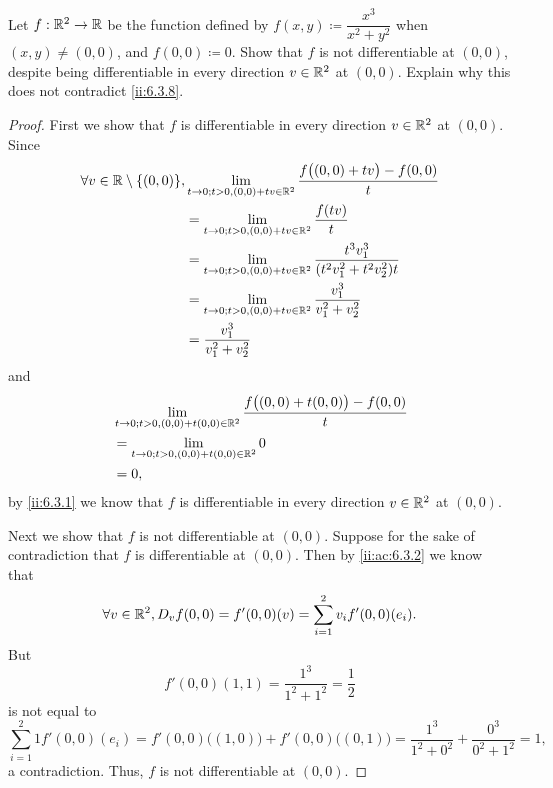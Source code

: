 \begin{ex}\label{ii:ex:6.3.3}
  Let \(f : \mathbb{R}^2 \to \mathbb{R}\) be the function defined by \(f(x, y) \coloneqq \dfrac{x^3}{x^2 + y^2}\) when \((x, y) \neq (0, 0)\), and \(f(0, 0) \coloneqq 0\).
  Show that \(f\) is not differentiable at \((0, 0)\), despite being differentiable in every direction \(v \in \mathbb{R}^2\) at \((0, 0)\).
  Explain why this does not contradict \cref{ii:6.3.8}.
\end{ex}

\begin{proof}
  First we show that \(f\) is differentiable in every direction \(v \in \mathbb{R}^2\) at \((0, 0)\).
  Since
  \begin{align*}
    \forall v \in \R \setminus \set{(0, 0)}, & \lim_{t \to 0 ; t > 0, (0, 0) + tv \in \R^2} \dfrac{f\big((0, 0) + tv\big) - f(0, 0)}{t}    \\
                                             & = \lim_{t \to 0 ; t > 0, (0, 0) + tv \in \R^2} \dfrac{f(tv)}{t}                             \\
                                             & = \lim_{t \to 0 ; t > 0, (0, 0) + tv \in \R^2} \dfrac{t^3 v_1^3}{(t^2 v_1^2 + t^2 v_2^2) t} \\
                                             & = \lim_{t \to 0 ; t > 0, (0, 0) + tv \in \R^2} \dfrac{v_1^3}{v_1^2 + v_2^2}                 \\
                                             & = \dfrac{v_1^3}{v_1^2 + v_2^2}
  \end{align*}
  and
  \begin{align*}
     & \lim_{t \to 0 ; t > 0, (0, 0) + t (0, 0) \in \mathbb{R}^2} \dfrac{f\big((0, 0) + t(0, 0)\big) - f(0, 0)}{t} \\
     & = \lim_{t \to 0 ; t > 0, (0, 0) + t (0, 0) \in \mathbb{R}^2} 0                                              \\
     & = 0,
  \end{align*}
  by \cref{ii:6.3.1} we know that \(f\) is differentiable in every direction \(v \in \mathbb{R}^2\) at \((0, 0)\).

  Next we show that \(f\) is not differentiable at \((0, 0)\).
  Suppose for the sake of contradiction that \(f\) is differentiable at \((0, 0)\).
  Then by \cref{ii:ac:6.3.2} we know that
  \[
    \forall v \in \mathbb{R}^2, D_v f(0, 0) = f'(0, 0)(v) = \sum_{i = 1}^2 v_i f'(0, 0)(e_i).
  \]
  But
  \[
    f'(0, 0)(1, 1) = \dfrac{1^3}{1^2 + 1^2} = \dfrac{1}{2}
  \]
  is not equal to
  \[
    \sum_{i = 1}^2 1 f'(0, 0)(e_i) = f'(0, 0)\big((1, 0)\big) + f'(0, 0)\big((0, 1)\big) = \dfrac{1^3}{1^2 + 0^2} + \dfrac{0^3}{0^2 + 1^2} = 1,
  \]
  a contradiction.
  Thus, \(f\) is not differentiable at \((0, 0)\).


\end{proof}
